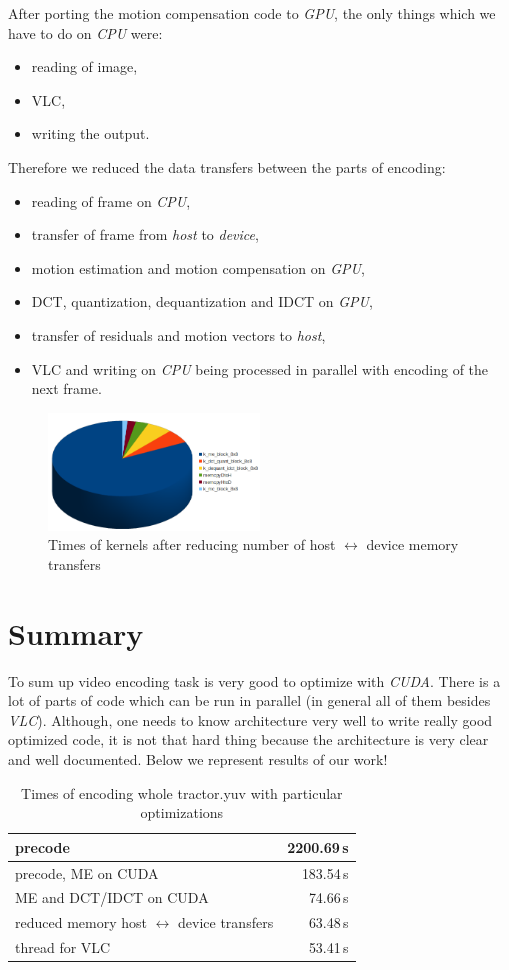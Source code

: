 \documentclass[11pt]{article}
\begin{document}
After porting the motion compensation code to \emph{GPU}, the only things
which we have to do on \emph{CPU} were:
\begin{itemize}
  \item reading of image,
  \item VLC,
  \item writing the output.
\end{itemize}
Therefore we reduced the data transfers between the parts of encoding:
\begin{itemize}
  \item reading of frame on \emph{CPU},
  \item transfer of frame from \emph{host} to \emph{device},
  \item motion estimation and motion compensation on \emph{GPU},
  \item DCT, quantization, dequantization and IDCT on \emph{GPU},
  \item transfer of residuals and motion vectors to \emph{host},
  \item VLC and writing on \emph{CPU} being processed in parallel with
  encoding of the next frame.
\end{itemize}

\begin{figure}[h]
\centering
\includegraphics[width=0.5\textwidth]{images/after_all_device.png}
\caption{Times of kernels after reducing number of host $\leftrightarrow$ device memory transfers}
\end{figure}

\section{Summary}
To sum up video encoding task is very good to optimize with \emph{CUDA}. There is a lot of parts of code which can be run in parallel (in general all of them besides \emph{VLC}). Although, one needs to know architecture very well to write really good optimized code, it is not that hard thing because the architecture is very clear and well documented. Below we represent results of our work!

\begin{table}[h]
\centering
\begin{tabular}{|l|r|}
\hline
precode & 2200.69\,s \\
\hline
precode, ME on CUDA & 183.54\,s \\
\hline
ME and DCT/IDCT on CUDA & 74.66\,s \\\hline
reduced memory host $\leftrightarrow$ device transfers & 63.48\,s \\
\hline
thread for VLC & 53.41\,s \\
\hline
\end{tabular}
\caption{Times of encoding whole tractor.yuv with particular optimizations}
\end{table}
\end{document}
